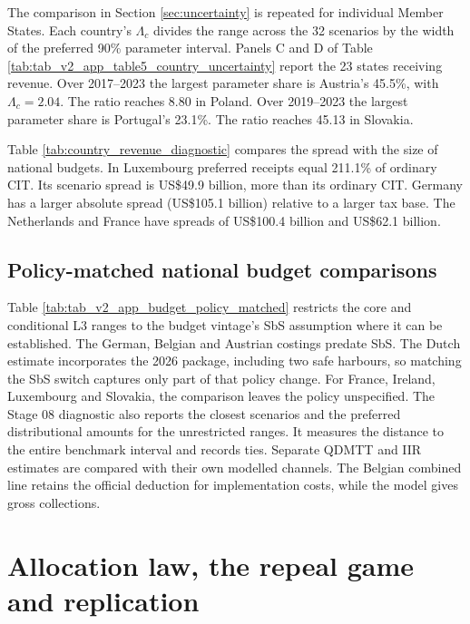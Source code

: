 \documentclass[11pt,a4paper]{article}
\newcommand{\usd}{US\$}
\begin{document}
The comparison in Section \ref{sec:uncertainty} is repeated for individual Member States. Each country’s $\Lambda_c$ divides the range across the 32 scenarios by the width of the preferred 90\% parameter interval. Panels C and D of Table \ref{tab:tab_v2_app_table5_country_uncertainty} report the 23 states receiving revenue. Over 2017–2023 the largest parameter share is Austria’s 45.5\%, with $\Lambda_c=2.04$. The ratio reaches 8.80 in Poland. Over 2019–2023 the largest parameter share is Portugal’s 23.1\%. The ratio reaches 45.13 in Slovakia.



Table \ref{tab:country_revenue_diagnostic} compares the spread with the size of national budgets. In Luxembourg preferred receipts equal 211.1\% of ordinary CIT. Its scenario spread is \usd49.9 billion, more than its ordinary CIT. Germany has a larger absolute spread (\usd105.1 billion) relative to a larger tax base. The Netherlands and France have spreads of \usd100.4 billion and \usd62.1 billion.

\clearpage
\subsection{Policy-matched national budget comparisons}\label{app:budget_benchmarks}

Table \ref{tab:tab_v2_app_budget_policy_matched} restricts the core and conditional L3 ranges to the budget vintage's SbS assumption where it can be established. The German, Belgian and Austrian costings predate SbS. The Dutch estimate incorporates the 2026 package, including two safe harbours, so matching the SbS switch captures only part of that policy change. For France, Ireland, Luxembourg and Slovakia, the comparison leaves the policy unspecified. The Stage 08 diagnostic also reports the closest scenarios and the preferred distributional amounts for the unrestricted ranges. It measures the distance to the entire benchmark interval and records ties. Separate QDMTT and IIR estimates are compared with their own modelled channels. The Belgian combined line retains the official deduction for implementation costs, while the model gives gross collections.




\section{Allocation law, the repeal game and replication}\label{app:allocation}
\end{document}
